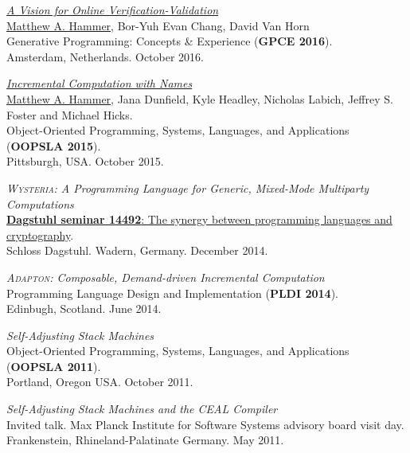 \documentclass[10pt,letterpaper]{article}
\renewenvironment{itemize}{
  \begin{list}{}{
    \setlength{\leftmargin}{1.5em}
    \setlength{\itemsep}{0.25em}
    \setlength{\parskip}{0pt}
    \setlength{\parsep}{0.25em}
  }
}{
  \end{list}
}
\begin{document}
\begin{itemize}

\item
\href{https://arxiv.org/abs/1608.06012}{\textit{A Vision for Online Verification-Validation}}
\\
\underline{Matthew A. Hammer}, Bor-Yuh Evan Chang, David Van Horn
\\
Generative Programming: Concepts \& Experience (\textbf{GPCE 2016}).
\\
Amsterdam, Netherlands. October 2016.

\item
\href{http://arxiv.org/abs/1503.07792}
{\textit{Incremental Computation with Names}}
\\
\underline{Matthew A. Hammer}, Jana Dunfield, Kyle Headley, Nicholas Labich,
Jeffrey S. Foster and Michael Hicks.
\\
Object-Oriented Programming, Systems, Languages, and Applications
(\textbf{OOPSLA 2015}).
\\
Pittsburgh, USA. October 2015.

\item
{\textit{\textsc{Wysteria}: A Programming Language for Generic, Mixed-Mode Multiparty Computations}}
\\
\href{http://www.dagstuhl.de/en/program/calendar/semhp/?semnr=14492}
{\textbf{Dagstuhl seminar 14492}: The synergy between programming languages and cryptography}.
\\
Schloss Dagstuhl. Wadern, Germany. December 2014.

\item
{\textit{\textsc{Adapton}: Composable, Demand-driven Incremental Computation}}
\\
Programming Language Design and Implementation (\textbf{PLDI 2014}).
\\
Edinbugh, Scotland. June 2014.

\item \textit{Self-Adjusting Stack Machines}
\\
Object-Oriented Programming, Systems, Languages, and Applications
(\textbf{OOPSLA 2011}).
\\
Portland, Oregon USA. October 2011.

\item \textit{Self-Adjusting Stack Machines and the CEAL Compiler}
\\
Invited talk.  Max Planck Institute for Software Systems
advisory board visit day.
\\
Frankenstein, Rhineland-Palatinate Germany. May 2011.


\end{itemize}
\end{document}
